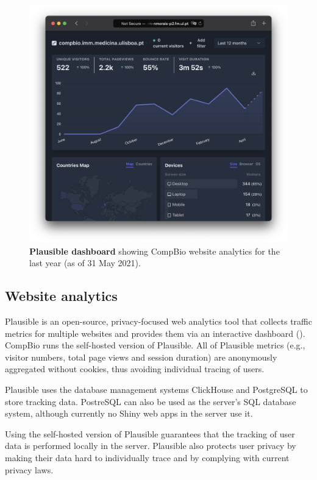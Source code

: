 \begin{figure}
  \includegraphics[width=\linewidth]{images/app-server/plausible}
  \caption[Plausible dashboard]{\textbf{Plausible dashboard} showing CompBio website analytics for the last year (as of 31 May 2021).}
  \label{fig:plausible}
\end{figure}

\subsection{Website analytics}

Plausible is an open-source, privacy-focused web analytics tool that collects traffic metrics for multiple websites and provides them via an interactive dashboard (). CompBio runs the self-hosted version of Plausible. All of Plausible metrics (e.g., visitor numbers, total page views and session duration) are anonymously aggregated without cookies, thus avoiding individual tracing of users.

Plausible uses the database management systems ClickHouse and PostgreSQL to store tracking data. PostreSQL can also be used as the server's SQL database system, although currently no Shiny web apps in the server use it.

Using the self-hosted version of Plausible guarantees that the tracking of user data is performed locally in the server. Plausible also protects user privacy by making their data hard to individually trace and by complying with current privacy laws. %

